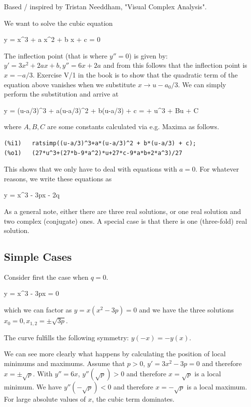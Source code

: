 

Based / inspired by Tristan Needdham, "Visual Complex Analysis".


We want to solve the cubic equation

\bee
y = x^3 + a x^2 + b x + c = 0
\eee

The inflection point (that is where $y'' = 0$) is given by: $y' = 3x^2 + 2ax + b, y'' = 6x + 2a$ and from this follows that the inflection point is $x = -a / 3$. Exercise V/1 in the book is to show that the quadratic term of the equation above vanishes when we substitute $x \rightarrow u - a_0/3$. We can simply perform the substitution and arrive at 

\bee
y = (u-a/3)^3 + a(u-a/3)^2 + b(u-a/3) + c = \cdots + u^3 + Bu + C
\eee

where $A,B,C$ are some constants calculated via e.g. Maxima as follows.

\begin{verbatim}
(%i1)	ratsimp((u-a/3)^3+a*(u-a/3)^2 + b*(u-a/3) + c);
(%o1)	(27*u^3+(27*b-9*a^2)*u+27*c-9*a*b+2*a^3)/27
\end{verbatim}

This shows that we only have to deal with equations with $a=0$. For whatever reasons, we write these equations as

\be
\label{2018-03-05:eq1}
y = x^3 - 3px - 2q
\ee

As a general note, either there are three real solutions, or one real solution and two complex (conjugate) ones. A special case is that there is one (three-fold) real solution.


\subsection{Simple Cases}

Consider first the case when $q=0$.

\bee
y = x^3 - 3px = 0
\eee

which we can factor as $y = x(x^2 - 3p) = 0$ and we have the three solutions $x_0 = 0, x_{1,2} = \pm \sqrt{3p}$.

The curve fulfills the following symmetry: $y(-x) = -y(x)$.

We can see more clearly what happens by calculating the position of local minimums and maximums. Assume that $p>0$, $y' = 3x^2 - 3p = 0$ and therefore $x = \pm \sqrt{p}$. With $y'' = 6x$, $y''(\sqrt{p}) > 0$ and therefore $x = \sqrt{p}$ is a local minimum. We have $y''(-\sqrt{p}) < 0$ and therefore $x = -\sqrt{p}$ is a local maximum. For large absolute values of $x$, the cubic term dominates.

